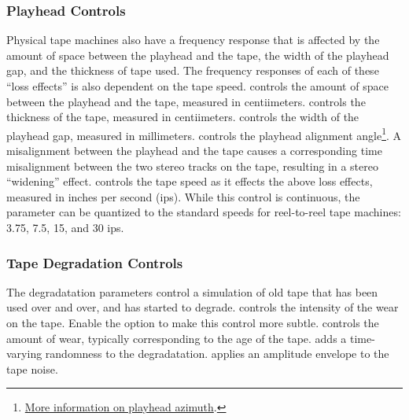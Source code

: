 \documentclass[landscape,twocolumn,a5paper]{manual}
\begin{document}
\subsubsection{Playhead Controls}
Physical tape machines also have a frequency response that
is affected by the amount of space between the playhead and
the tape, the width of the playhead gap, and the thickness
of tape used. The frequency responses of each of these ``loss
effects'' is also dependent on the tape speed.
\newpar
{}
controls the amount of space between the playhead and the tape,
measured in centiimeters.
\newpar
{} controls the thickness
of the tape, measured in centiimeters.
\newpar
{} controls
the width of the playhead gap, measured in millimeters.
\newpar
{}
controls the playhead alignment angle\footnote{\href{https://blog.weareavp.com/azimuth-adjustment-for-magnetic-audio-recordings}{More information on playhead azimuth}.}.
A misalignment between the playhead and the tape causes a
corresponding time misalignment between the two stereo tracks
on the tape, resulting in a stereo ``widening'' effect.
\newpar
{}
controls the tape speed as it effects the above loss effects,
measured in inches per second (ips). While this control is
continuous, the parameter can be quantized to the standard speeds
for reel-to-reel tape machines: 3.75, 7.5, 15, and 30 ips.


\subsubsection{Tape Degradation Controls}
The degradatation parameters control a simulation of
old tape that has been used over and over, and has started
to degrade.
\newline
{}
controls the intensity of the wear on the tape. Enable the
 option to make this control more subtle.
\newpar
{}
controls the amount of wear, typically corresponding to
the age of the tape.
\newpar
{}
adds a time-varying randomness to the degradatation.
\newpar
{}
applies an amplitude envelope to the tape noise.
\end{document}

